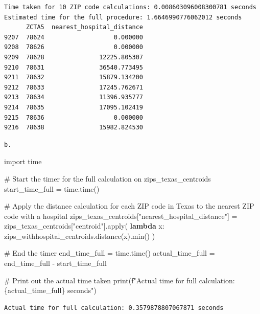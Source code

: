 \documentclass[
  letterpaper,
  DIV=11,
  numbers=noendperiod]{scrartcl}
\newenvironment{Shaded}{\begin{snugshade}}{\end{snugshade}}
\newcommand{\BuiltInTok}[1]{\textcolor[rgb]{0.00,0.23,0.31}{#1}}
\newcommand{\CommentTok}[1]{\textcolor[rgb]{0.37,0.37,0.37}{#1}}
\newcommand{\ImportTok}[1]{\textcolor[rgb]{0.00,0.46,0.62}{#1}}
\newcommand{\KeywordTok}[1]{\textcolor[rgb]{0.00,0.23,0.31}{\textbf{#1}}}
\newcommand{\NormalTok}[1]{\textcolor[rgb]{0.00,0.23,0.31}{#1}}
\newcommand{\OperatorTok}[1]{\textcolor[rgb]{0.37,0.37,0.37}{#1}}
\newcommand{\SpecialCharTok}[1]{\textcolor[rgb]{0.37,0.37,0.37}{#1}}
\newcommand{\SpecialStringTok}[1]{\textcolor[rgb]{0.13,0.47,0.30}{#1}}
\newcommand{\StringTok}[1]{\textcolor[rgb]{0.13,0.47,0.30}{#1}}
\begin{document}
\begin{verbatim}
Time taken for 10 ZIP code calculations: 0.008603096008300781 seconds
Estimated time for the full procedure: 1.6646990776062012 seconds
      ZCTA5  nearest_hospital_distance
9207  78624                   0.000000
9208  78626                   0.000000
9209  78628               12225.805307
9210  78631               36540.773495
9211  78632               15879.134200
9212  78633               17245.762671
9213  78634               11396.935777
9214  78635               17095.102419
9215  78636                   0.000000
9216  78638               15982.824530
\end{verbatim}

\begin{verbatim}
b.
\end{verbatim}

\begin{Shaded}
\begin{Highlighting}[]
\ImportTok{import}\NormalTok{ time}

\CommentTok{\# Start the timer for the full calculation on zips\_texas\_centroids}
\NormalTok{start\_time\_full }\OperatorTok{=}\NormalTok{ time.time()}

\CommentTok{\# Apply the distance calculation for each ZIP code in Texas to the nearest ZIP code with a hospital}
\NormalTok{zips\_texas\_centroids[}\StringTok{"nearest\_hospital\_distance"}\NormalTok{] }\OperatorTok{=}\NormalTok{ zips\_texas\_centroids[}\StringTok{"centroid"}\NormalTok{].}\BuiltInTok{apply}\NormalTok{(}
    \KeywordTok{lambda}\NormalTok{ x: zips\_withhospital\_centroids.distance(x).}\BuiltInTok{min}\NormalTok{()}
\NormalTok{)}

\CommentTok{\# End the timer}
\NormalTok{end\_time\_full }\OperatorTok{=}\NormalTok{ time.time()}
\NormalTok{actual\_time\_full }\OperatorTok{=}\NormalTok{ end\_time\_full }\OperatorTok{{-}}\NormalTok{ start\_time\_full}

\CommentTok{\# Print out the actual time taken}
\BuiltInTok{print}\NormalTok{(}\SpecialStringTok{f"Actual time for full calculation: }\SpecialCharTok{\{}\NormalTok{actual\_time\_full}\SpecialCharTok{\}}\SpecialStringTok{ seconds"}\NormalTok{)}
\end{Highlighting}
\end{Shaded}

\begin{verbatim}
Actual time for full calculation: 0.3579878807067871 seconds
\end{verbatim}
\end{document}

